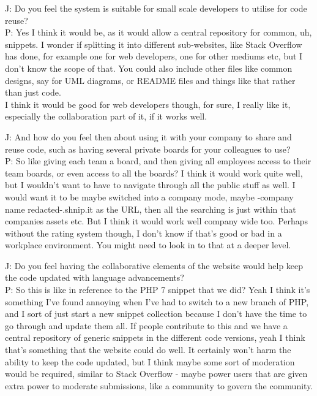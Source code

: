 J: \-\hspace{1.4cm}Do you feel the system is suitable for small scale developers to utilise for code reuse? \\
P: Yes I think it would be, as it would allow a central repository for common, uh, snippets. I wonder if splitting it into different sub-websites, like Stack Overflow has done, for example one for web developers, one for other mediums etc, but I don't know the scope of that. You could also include other files like common designs, say for UML diagrams, or README files and things like that rather than just code. \\
I think it would be good for web developers though, for sure, I really like it, especially the collaboration part of it, if it works well.

J: \-\hspace{1.4cm}And how do you feel then about using it with your company to share and reuse code, such as having several private boards for your colleagues to use? \\
P: So like giving each team a board, and then giving all employees access to their team boards, or even access to all the boards? I think it would work quite well, but I wouldn't want to have to navigate through all the public stuff as well. I would want it to be maybe switched into a company mode, maybe -company name redacted-.shnip.it as the URL, then all the searching is just within that companies assets etc. But I think it would work well company wide too. Perhaps without the rating system though, I don't know if that's good or bad in a workplace environment. You might need to look in to that at a deeper level.


J: \-\hspace{1.4cm}Do you feel having the collaborative elements of the website would help keep the code updated with language advancements? \\
P: So this is like in reference to the PHP 7 snippet that we did? Yeah I think it's something I've found annoying when I've had to switch to a new branch of PHP, and I sort of just start a new snippet collection because I don't have the time to go through and update them all. If people contribute to this and we have a central repository of generic snippets in the different code versions, yeah I think that's something that the website could do well. It certainly won't harm the ability to keep the code updated, but I think maybe some sort of moderation would be required, similar to Stack Overflow - maybe power users that are given extra power to moderate submissions, like a community to govern the community.

